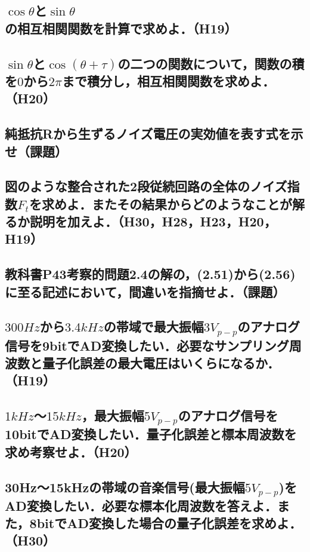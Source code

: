 \newpage
\subsection{$\cos \theta$と$\sin \theta$の相互相関関数を計算で求めよ．（H19）}
\vspace{11cm}

\subsection{$\sin \theta$と$\cos(\theta + \tau)$の二つの関数について，関数の積を$0$から$2 \pi$まで積分し，相互相関関数を求めよ．（H20）}
\vspace{11cm}

\newpage
\subsection{純抵抗Rから生ずるノイズ電圧の実効値を表す式を示せ（課題）}
\vspace{7cm}

\subsection{図のような整合された2段従続回路の全体のノイズ指数$F_t$を求めよ．またその結果からどのようなことが解るか説明を加えよ．（H30，H28，H23，H20，H19）}
\vspace{7cm}

\subsection{教科書P43考察的問題2.4の解の，(2.51)から(2.56)に至る記述において，間違いを指摘せよ．（課題）}
\vspace{7cm}

\newpage
\subsection{$300Hz$から$3.4kHz$の帯域で最大振幅$3V_{p-p}$のアナログ信号を9bitでAD変換したい．必要なサンプリング周波数と量子化誤差の最大電圧はいくらになるか．（H19）}
\vspace{7cm}

\subsection{$1kHz$〜$15kHz$，最大振幅$5V_{p-p}$のアナログ信号を10bitでAD変換したい．量子化誤差と標本周波数を求め考察せよ．（H20）}
\vspace{7cm}

\subsection{30Hz〜15kHzの帯域の音楽信号(最大振幅$5V_{p-p}$)をAD変換したい．必要な標本化周波数を答えよ．また，8bitでAD変換した場合の量子化誤差を求めよ．（H30）}



